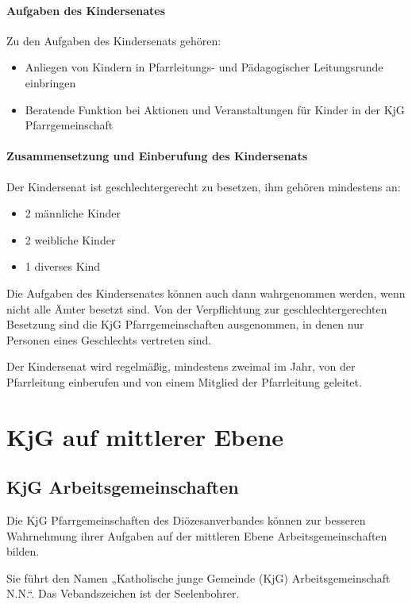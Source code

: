 \documentclass[12pt]{report}
\newcommand{\footnoterecall}[1]{%
  \footnotemark[\value{#1}]
}
\begin{document}
\begin{flushleft}
\subsubsection{Aufgaben des Kindersenates}
Zu den Aufgaben des Kindersenats gehören:
\begin{itemize}
  \item Anliegen von Kindern in Pfarrleitungs- und Pädagogischer Leitungsrunde einbringen
  \item Beratende Funktion bei Aktionen und Veranstaltungen für Kinder in der KjG Pfarrgemeinschaft
\end{itemize}

\subsubsection{Zusammensetzung und Einberufung des Kindersenats}

Der Kindersenat ist geschlechtergerecht zu besetzen, ihm gehören mindestens an:

\begin{itemize}
  \item 2 männliche Kinder
  \item 2 weibliche Kinder
  \item 1 diverses Kind
\end{itemize}
Die Aufgaben des Kindersenates können auch dann wahrgenommen werden, wenn nicht alle Ämter besetzt sind.
Von der Verpflichtung zur geschlechtergerechten\footnoterecall{geschlechtergerecht} Besetzung sind die KjG Pfarrgemeinschaften ausgenommen,
in denen nur Personen eines Geschlechts vertreten sind.

Der Kindersenat wird regelmäßig, mindestens zweimal im Jahr, von der Pfarrleitung einberufen
und von einem Mitglied der Pfarrleitung geleitet.

\chapter{KjG auf mittlerer Ebene}

\section{KjG Arbeitsgemeinschaften}

Die KjG Pfarrgemeinschaften des Diözesanverbandes können zur besseren Wahrnehmung ihrer
Aufgaben auf der mittleren Ebene Arbeitsgemeinschaften bilden.

Sie führt den Namen „Katholische junge Gemeinde (KjG) Arbeitsgemeinschaft N.N.“.
Das Vebandszeichen ist der Seelenbohrer.


\end{flushleft}
\end{document}
